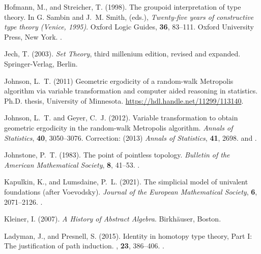\documentclass[11pt]{article}
\begin{document}
\begin{thebibliography}{}
Hofmann, M., and Streicher, T. (1998).
\newblock The groupoid interpretation of type theory.
\newblock In G. Sambin and J.~M. Smith, (eds.),
    \emph{Twenty-five years of constructive type theory (Venice, 1995)}.
\newblock Oxford Logic Guides, \textbf{36}, 83--111.
\newblock Oxford University Press, New York.
\newblock {}.

Jech, T. (2003).
\newblock \emph{Set Theory}, third millenium edition, revised and expanded.
\newblock Springer-Verlag, Berlin.

Johnson, L.~T. (2011)
\newblock Geometric ergodicity of a random-walk Metropolis algorithm
    via variable transformation and computer aided reasoning in statistics.
\newblock Ph.D. thesis, University of Minnesota.
\newblock \url{https://hdl.handle.net/11299/113140}.

Johnson, L.~T. and Geyer, C.~J. (2012).
\newblock Variable transformation to obtain geometric ergodicity
    in the random-walk Metropolis algorithm.
\newblock \emph{Annals of Statistics}, \textbf{40}, 3050--3076.
\newblock Correction: (2013) \emph{Annals of Statistics}, \textbf{41}, 2698.
\newblock {} and .

Johnstone, P.~T. (1983).
\newblock The point of pointless topology.
\newblock \emph{Bulletin of the American Mathematical Society},
    \textbf{8}, 41--53.
\newblock {}.


Kapulkin, K., and Lumsdaine, P.~L. (2021).
\newblock The simplicial model of univalent foundations (after Voevodsky).
\newblock \emph{Journal of the European Mathematical Society},
    \textbf{6}, 2071--2126.
\newblock {}.

Kleiner, I. (2007).
\newblock \emph{A History of Abstract Algebra}.
\newblock Birkh\"{a}user, Boston.

Ladyman, J., and Presnell, S. (2015).
\newblock Identity in homotopy type theory, Part I: The justification of
    path induction.
, \textbf{23}, 386--406.
\newblock {}.


\end{thebibliography}
\end{document}
